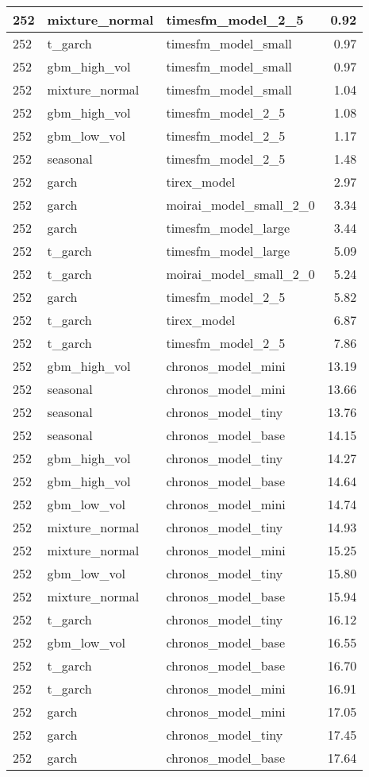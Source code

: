{\begin{tabular}{lllr}
\midrule
252 & mixture\_normal & timesfm\_model\_2\_5 & 0.92 \\
\midrule
252 & t\_garch & timesfm\_model\_small & 0.97 \\
\midrule
252 & gbm\_high\_vol & timesfm\_model\_small & 0.97 \\
\midrule
252 & mixture\_normal & timesfm\_model\_small & 1.04 \\
\midrule
252 & gbm\_high\_vol & timesfm\_model\_2\_5 & 1.08 \\
\midrule
252 & gbm\_low\_vol & timesfm\_model\_2\_5 & 1.17 \\
\midrule
252 & seasonal & timesfm\_model\_2\_5 & 1.48 \\
\midrule
252 & garch & tirex\_model & 2.97 \\
\midrule
252 & garch & moirai\_model\_small\_2\_0 & 3.34 \\
\midrule
252 & garch & timesfm\_model\_large & 3.44 \\
\midrule
252 & t\_garch & timesfm\_model\_large & 5.09 \\
\midrule
252 & t\_garch & moirai\_model\_small\_2\_0 & 5.24 \\
\midrule
252 & garch & timesfm\_model\_2\_5 & 5.82 \\
\midrule
252 & t\_garch & tirex\_model & 6.87 \\
\midrule
252 & t\_garch & timesfm\_model\_2\_5 & 7.86 \\
\midrule
252 & gbm\_high\_vol & chronos\_model\_mini & 13.19 \\
\midrule
252 & seasonal & chronos\_model\_mini & 13.66 \\
\midrule
252 & seasonal & chronos\_model\_tiny & 13.76 \\
\midrule
252 & seasonal & chronos\_model\_base & 14.15 \\
\midrule
252 & gbm\_high\_vol & chronos\_model\_tiny & 14.27 \\
\midrule
252 & gbm\_high\_vol & chronos\_model\_base & 14.64 \\
\midrule
252 & gbm\_low\_vol & chronos\_model\_mini & 14.74 \\
\midrule
252 & mixture\_normal & chronos\_model\_tiny & 14.93 \\
\midrule
252 & mixture\_normal & chronos\_model\_mini & 15.25 \\
\midrule
252 & gbm\_low\_vol & chronos\_model\_tiny & 15.80 \\
\midrule
252 & mixture\_normal & chronos\_model\_base & 15.94 \\
\midrule
252 & t\_garch & chronos\_model\_tiny & 16.12 \\
\midrule
252 & gbm\_low\_vol & chronos\_model\_base & 16.55 \\
\midrule
252 & t\_garch & chronos\_model\_base & 16.70 \\
\midrule
252 & t\_garch & chronos\_model\_mini & 16.91 \\
\midrule
252 & garch & chronos\_model\_mini & 17.05 \\
\midrule
252 & garch & chronos\_model\_tiny & 17.45 \\
\midrule
252 & garch & chronos\_model\_base & 17.64 \\
\bottomrule
\end{tabular}
}